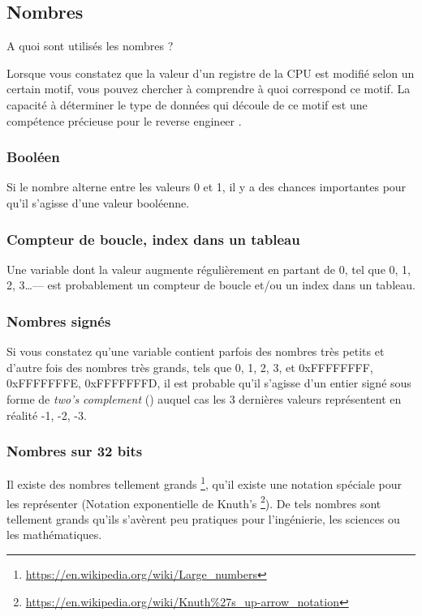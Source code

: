 \subsection{Nombres}

A quoi sont utilisés les nombres ?

Lorsque vous constatez que la valeur d'un registre de la CPU est modifié selon un certain motif, vous pouvez
chercher à comprendre à quoi correspond ce motif.
La capacité à déterminer le type de données qui découle de ce motif est une compétence précieuse pour le reverse engineer .

\subsubsection{Booléen}

Si le nombre alterne entre les valeurs 0 et 1, il y a des chances importantes pour qu'il s'agisse d'une valeur booléenne.

\subsubsection{Compteur de boucle, index dans un tableau}

Une variable dont la valeur augmente régulièrement en partant de 0, tel que 0, 1, 2, 3\dots--- est probablement un
compteur de boucle et/ou un index dans un tableau.

\subsubsection{Nombres signés}

Si vous constatez qu'une variable contient parfois des nombres très petits et d'autre fois des nombres très grands,
tels que 0, 1, 2, 3, et 0xFFFFFFFF, 0xFFFFFFFE, 0xFFFFFFFD, il est probable qu'il s'agisse d'un entier signé sous
forme de \emph{two's complement} () auquel cas les 3 dernières valeurs représentent en réalité
-1, -2, -3.

\subsubsection{Nombres sur 32 bits}

Il existe des nombres tellement grands \footnote{\url{https://en.wikipedia.org/wiki/Large_numbers}},
qu'il existe une notation spéciale pour les représenter (Notation exponentielle de Knuth's
\footnote{\url{https://en.wikipedia.org/wiki/Knuth\%27s_up-arrow_notation}}).
De tels nombres sont tellement grands qu'ils s'avèrent peu pratiques pour l'ingénierie, les sciences
ou les mathématiques.

